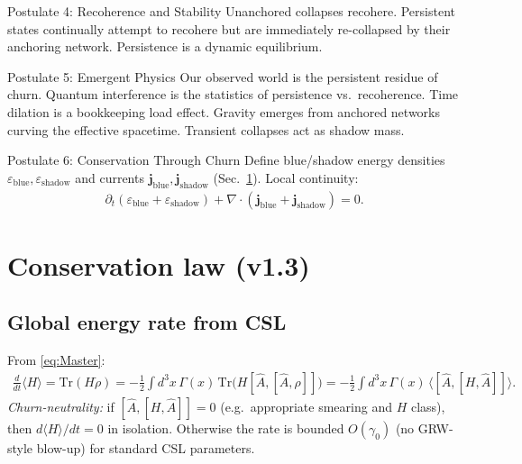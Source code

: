 \documentclass[11pt]{article}
\newcommand{\braket}[1]{\langle #1 \rangle}
\newcommand{\Tr}{\mathrm{Tr}}
\begin{document}
\begin{postulate}{Postulate 4: Recoherence and Stability}
Unanchored collapses recohere. Persistent states continually attempt to recohere but are immediately re-collapsed by their anchoring network. Persistence is a dynamic equilibrium.
\end{postulate}
\vspace{1em}

\begin{postulate}{Postulate 5: Emergent Physics}
Our observed world is the persistent residue of churn. Quantum interference is the statistics of persistence vs.\ recoherence. Time dilation is a bookkeeping load effect. Gravity emerges from anchored networks curving the effective spacetime. Transient collapses act as shadow mass.
\end{postulate}
\vspace{1em}

\begin{postulate}{Postulate 6: Conservation Through Churn}
Define blue/shadow energy densities $\varepsilon_{\mathrm{blue}},\varepsilon_{\mathrm{shadow}}$ and currents $\mathbf j_{\mathrm{blue}},\mathbf j_{\mathrm{shadow}}$ (Sec.~\ref{sec:conservation}). Local continuity:
\begin{align}
\partial_t(\varepsilon_{\mathrm{blue}}+\varepsilon_{\mathrm{shadow}})+\nabla\cdot(\mathbf j_{\mathrm{blue}}+\mathbf j_{\mathrm{shadow}})=0. \label{eq:localContinuity}
\end{align}
\end{postulate}

\section{Conservation law (v1.3)}\label{sec:conservation}

\subsection{Global energy rate from CSL}
From \eqref{eq:Master}:
\begin{align}
\frac{d}{dt}\braket{H}=\Tr(H\dot\rho)=-\frac12\!\int\!d^3x\,\Gamma(x)\,\Tr\!\big(H[\hat A,[\hat A,\rho]]\big)
=-\frac12\!\int\!d^3x\,\Gamma(x)\,\big\langle[\hat A,[H,\hat A]]\big\rangle.\label{eq:dHdt}
\end{align}
\emph{Churn-neutrality:} if $[\hat A,[H,\hat A]]=0$ (e.g.\ appropriate smearing and $H$ class), then $d\braket{H}/dt=0$ in isolation. Otherwise the rate is bounded $O(\gamma_0)$ (no GRW-style blow-up) for standard CSL parameters.
\end{document}
